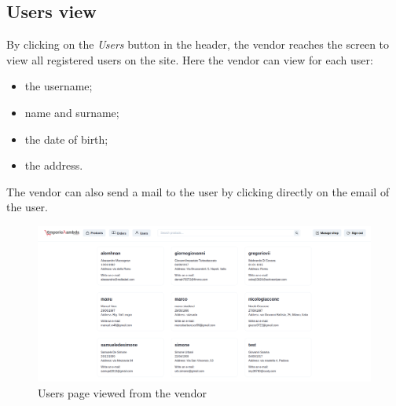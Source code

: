 \subsection{Users view}
By clicking on the \textit{Users} button in the header, the vendor reaches the screen to view all registered users on the site.
Here the vendor can view for each user:
\begin{itemize}
    \item the username;
    \item name and surname;
    \item the date of birth;
    \item the address.
\end{itemize}
The vendor can also send a mail to the user by clicking directly on the email of the user.
\begin{figure}[!ht]
    \caption{Users page viewed from the vendor}
    \vspace{5px}
    \includegraphics[scale=0.25]{../../../../Images/userManual/usersVendor.png}
    \centering
\end{figure}
\pagebreak

